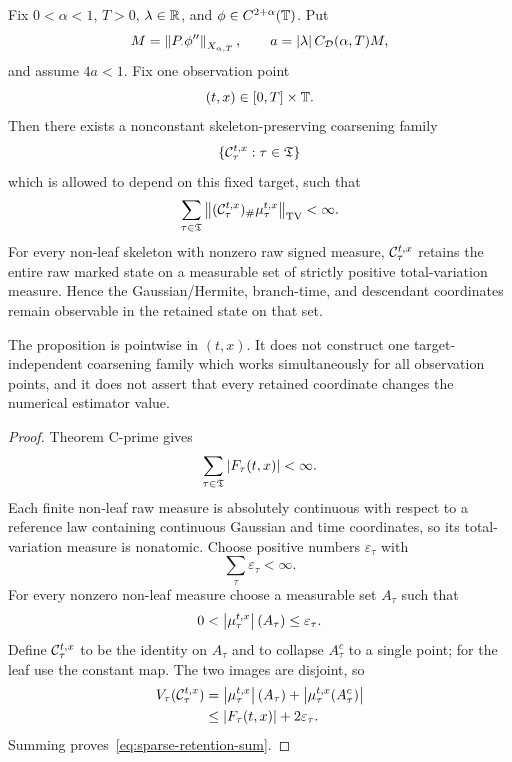 \begin{proposition}
\label{prop:sparse-raw-retention}
Fix $0<\alpha<1$, $T>0$, $\lambda\in\mathbb R$, and $\phi\in C^{2+\alpha}(\mathbb T)$. Put
\begin{equation*}
  M=\left\lVert P_\cdot\phi''\right\rVert_{X_{\alpha,T}},
  \qquad
  a=\left|\lambda\right| C_{\mathcal D}(\alpha,T)M,
\end{equation*}
and assume $4a<1$. Fix one observation point
\begin{equation*}
  (t,x)\in[0,T]\times\mathbb T.
\end{equation*}
Then there exists a nonconstant skeleton-preserving coarsening family
\begin{equation*}
  \{\mathcal C_\tau^{t,x}:\tau\in\mathfrak T\}
\end{equation*}
which is allowed to depend on this fixed target, such that
\begin{equation}
  \sum_{\tau\in\mathfrak T}
  \left\lVert(\mathcal C_\tau^{t,x})_\#\mu_\tau^{t,x}\right\rVert_{\mathrm{TV}}
  <\infty.
  \label{eq:sparse-retention-sum}
\end{equation}
For every non-leaf skeleton with nonzero raw signed measure, $\mathcal C_\tau^{t,x}$ retains the entire raw marked state on a measurable set of strictly positive total-variation measure. Hence the Gaussian/Hermite, branch-time, and descendant coordinates remain observable in the retained state on that set.

The proposition is pointwise in $(t,x)$. It does not construct one target-independent coarsening family which works simultaneously for all observation points, and it does not assert that every retained coordinate changes the numerical estimator value.
\end{proposition}

\begin{proof}
Theorem C-prime gives
\begin{equation*}
  \sum_{\tau\in\mathfrak T}
  \left|F_\tau(t,x)\right|<\infty.
\end{equation*}
Each finite non-leaf raw measure is absolutely continuous with respect to a reference law containing continuous Gaussian and time coordinates, so its total-variation measure is nonatomic. Choose positive numbers $\varepsilon_\tau$ with
\begin{equation*}
  \sum_\tau\varepsilon_\tau<\infty.
\end{equation*}
For every nonzero non-leaf measure choose a measurable set $A_\tau$ such that
\begin{equation*}
  0<
  \left|\mu_\tau^{t,x}\right|(A_\tau)
  \leq
  \varepsilon_\tau.
\end{equation*}
Define $\mathcal C_\tau^{t,x}$ to be the identity on $A_\tau$ and to collapse $A_\tau^c$ to a single point; for the leaf use the constant map. The two images are disjoint, so
\begin{align*}
  V_\tau(\mathcal C_\tau^{t,x})
  &=
  \left|\mu_\tau^{t,x}\right|(A_\tau)
  +
  \left|\mu_\tau^{t,x}(A_\tau^c)\right|\\
  &\leq
  \left|F_\tau(t,x)\right|
  +
  2\varepsilon_\tau.
\end{align*}
Summing proves~\eqref{eq:sparse-retention-sum}.
\end{proof}

